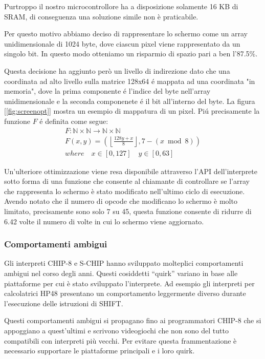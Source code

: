 \documentclass[a4paper]{article}
\begin{document}
Purtroppo il nostro microcontrollore ha a disposizione solamente 16 KB di SRAM, di conseguenza una soluzione simile non è praticabile.

Per questo motivo abbiamo deciso di rappresentare lo schermo come un array unidimensionale di 1024 byte, dove ciascun pixel viene rappresentato da un singolo bit. In questo modo otteniamo un risparmio di spazio pari a ben l'87.5\%.

Questa decisione ha aggiunto però un livello di indirezione dato che una coordinata ad alto livello sulla matrice 128x64 é mappata ad una coordinata "in memoria", dove la prima componente é l'indice del byte nell'array unidimensionale e la seconda componenete é il bit all'interno del byte. La figura [\ref{fig:screenopt}] mostra un esempio di mappatura di un pixel. Piú precisamente la funzione $F$ é definita come segue:
\begin{gather*}
    F: \mathbb{N} \times \mathbb{N} \rightarrow \mathbb{N} \times \mathbb{N} \\
    F(x, y) = \left(\left\lfloor \frac{128y + x}{8} \right\rfloor, 7 - (x \bmod 8)\right) \\
    where \quad x \in [0, 127] \quad y \in [0, 63]
\end{gather*}

Un'ulteriore ottimizzazione viene resa disponibile attraverso l'API dell'interprete sotto forma di una funzione che consente al chiamante di controllare se l'array che rappresenta lo schermo è stato modificato nell'ultimo ciclo di esecuzione. Avendo notato che il numero di opcode che modificano lo schermo è molto limitato, precisamente sono solo 7 su 45, questa funzione consente di ridurre di 6.42 volte il numero di volte in cui
lo schermo viene aggiornato.


\subsubsection{Comportamenti ambigui}

Gli interpreti CHIP-8 e S-CHIP hanno sviluppato molteplici comportamenti ambigui nel corso degli anni. Questi cosiddetti ``quirk'' variano in base alle piattaforme per cui è stato sviluppato l'interprete. Ad esempio gli interpreti per calcolatrici HP48 presentano un comportamento leggermente diverso durante l'esecuzione delle istruzioni di SHIFT.

Questi comportamenti ambigui si propagano fino ai programmatori
CHIP-8 che si appoggiano a quest'ultimi e scrivono videogiochi che
non sono del tutto compatibili con interpreti più vecchi. Per evitare
questa frammentazione è necessario supportare le piattaforme
principali e i loro quirk.
\end{document}
